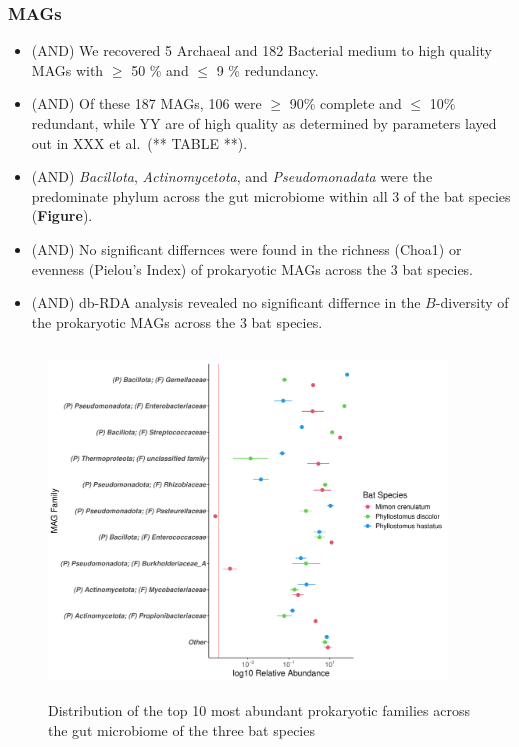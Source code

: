 \documentclass[
]{article}
\begin{document}
\subsubsection{MAGs}\label{mags}

\begin{itemize}
\item
  (AND) We recovered 5 Archaeal and 182 Bacterial medium to high quality
  MAGs with \(\geq\) 50 \% and \(\leq\) 9 \% redundancy.
\item
  (AND) Of these 187 MAGs, 106 were \(\geq\) 90\% complete and \(\leq\)
  10\% redundant, while YY are of high quality as determined by
  parameters layed out in XXX et al.~(** TABLE **).
\item
  (AND) \emph{Bacillota}, \emph{Actinomycetota}, and
  \emph{Pseudomonadata} were the predominate phylum across the gut
  microbiome within all 3 of the bat species (\textbf{Figure}).
\item
  (AND) No significant differnces were found in the richness (Choa1) or
  evenness (Pielou's Index) of prokaryotic MAGs across the 3 bat
  species.
\item
  (AND) db-RDA analysis revealed no significant differnce in the
  \(B\)-diversity of the prokaryotic MAGs across the 3 bat species.
\end{itemize}

\begin{figure}
\includegraphics[width=400px,height=350px]{../../data/results/figures/FigX_top10_most_abun_mag_taxa} \caption{Distribution of the top 10 most abundant prokaryotic families across the gut microbiome of the three bat species}\label{fig:FigX}
\end{figure}
\end{document}
